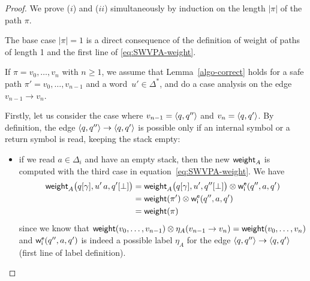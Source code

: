 \begin{proof}
We prove ($i$) and ($ii$) simultaneously by induction on the length $|\pi|$ of the path $\pi$.

\noindent
The base case $|\pi| = 1$ is a direct consequence of the definition of weight of paths of length 1
and the first line of \eqref{eq:SWVPA-weight}.

\noindent
If $\pi = v_0,\ldots, v_n$ with $n \geq 1$, 
we assume that Lemma~\ref{algo-correct} holds for a safe path $\pi' = v_0,\ldots, v_{n-1}$ and a word~$u' \in \Delta^*$, 
and do a case analysis on the edge~$v_{n-1} \to v_n$.

\smallskip\noindent
Firstly, let us consider the case where $v_{n-1} = \< q, q''>$ and $v_{n} = \< q, q'>$. 
By definition, the edge $\< q, q''> \to \< q, q'>$ is possible only if an internal symbol or a return symbol is read, 
keeping the stack empty:

\begin{itemize}
\item if we read $a \in \Delta_i$ and have an empty stack, 
then the new $\mathsf{weight}_A$ is computed 
with the third case in equation~\eqref{eq:SWVPA-weight}.
We have
\begin{align*}
 \weight_A\bigl(\config{q}{\gamma}, u'\, a,
               \config{q'}{\bot}\bigr) &=
   \weight_A\bigl(\config{q}{\gamma}, u', \config{q''}{\bot}\bigr)
   \otimes\weiei(q'', a, q')  \\
 &= \weight(\pi')\otimes\weiei(q'', a, q')\\
 &= \weight(\pi)\nonumber 
\end{align*}
since we know that $\mathsf{weight}(v_0,\ldots, v_{n-1}) \otimes \eta_A(v_{n-1} \to v_{n}) = \mathsf{weight}(v_0,\ldots, v_n)$ and $\weiei(q'', a, q')$ is indeed a possible label $\eta_A$ for the edge $\< q, q''> \to \< q, q'>$ (first line of label definition). 


\end{itemize}
\end{proof}
